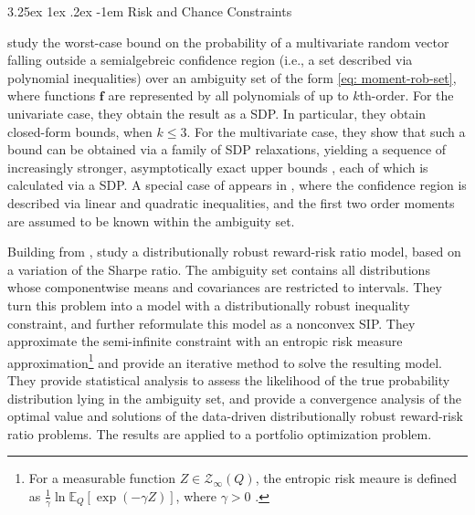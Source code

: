 \documentclass[final,onefignum,onetabnum]{class}
\makeatletter
\renewcommand\paragraph{\@startsection{paragraph}{4}{\z@}%
  {3.25ex \@plus1ex \@minus.2ex}%
  {-1em}%
  {\normalfont\normalsize\bfseries}}
\newcommand{\ee}[2]{\mathbb{E}_{#1} \left[ #2 \right]}
\newcommand{\bs}[1]{\boldsymbol{#1}} %
\newcommand{\Cs}[1]{\mathcal{#1}} %
\makeatother
\begin{document}
\paragraph{Risk and Chance Constraints}

\citet{bertsimas2005optimal} study the worst-case bound on the probability of a multivariate random vector falling outside a semialgebreic confidence region  (i.e., a set described via polynomial inequalities) over an ambiguity set of the form  \eqref{eq: moment-rob-set}, where  functions $\bs{f}$ are represented by all polynomials of up to $k$th-order. For the univariate case, they obtain the result as a SDP. In particular, they obtain closed-form bounds, when $k \le 3$. For the multivariate case, they show that such a bound can be obtained via a family of SDP relaxations, yielding  a sequence of increasingly stronger, asymptotically
exact upper bounds%
, each of which is calculated via a SDP. A special case of \citet{bertsimas2005optimal} appears in \citet{vandenberghe2007}, where the confidence region is described via linear and quadratic inequalities, and the first two order moments are assumed to be known within the ambiguity set. 

Building from \citet{chen2018discrete}, \citet{liu2017} study a distributionally robust reward-risk
ratio model, based on a variation of the Sharpe ratio. The ambiguity set contains all distributions whose componentwise   means and covariances are restricted to  intervals. They turn this problem into a model with a distributionally robust inequality constraint, and further reformulate this model as a nonconvex SIP. They approximate the semi-infinite constraint with  an entropic risk measure approximation\footnote{For a measurable function $Z \in \Cs{Z}_{\infty}(Q)$, the entropic risk meaure is defined as $\frac{1}{\gamma} \ln \ee{Q}{\exp{(-\gamma Z)}}$, where $\gamma>0$ \citep{liu2017}.}  and provide an iterative method to solve the resulting model. They provide statistical analysis to assess the likelihood of the true probability distribution lying in the ambiguity set, and provide a  convergence analysis of the optimal value and solutions of the data-driven distributionally robust reward-risk ratio problems. The  results are applied to  a portfolio optimization problem. 
\end{document}
